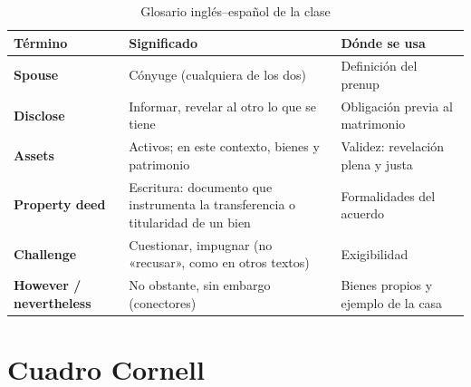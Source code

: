 \documentclass[12pt,oneside]{book}
\begin{document}
\begin{table}[H]
\centering
\caption{Glosario inglés--español de la clase}
\begin{tabularx}{\textwidth}{@{}>{\raggedright\arraybackslash}p{}YY@{}}
\toprule
\textbf{Término} & \textbf{Significado} & \textbf{Dónde se usa} \\
\midrule
\textbf{Spouse} & Cónyuge (cualquiera de los dos) & Definición del prenup \\
\textbf{Disclose} & Informar, revelar al otro lo que se tiene & Obligación previa al matrimonio \\
\textbf{Assets} & Activos; en este contexto, bienes y patrimonio & Validez: revelación plena y justa \\
\textbf{Property deed} & Escritura: documento que instrumenta la transferencia o titularidad de un bien & Formalidades del acuerdo \\
\textbf{Challenge} & Cuestionar, impugnar (no «recusar», como en otros textos) & Exigibilidad \\
\textbf{However / nevertheless} & No obstante, sin embargo (conectores) & Bienes propios y ejemplo de la casa \\
\bottomrule
\end{tabularx}
\end{table}

\section{Cuadro Cornell}
\end{document}
